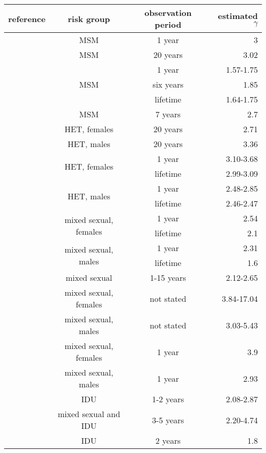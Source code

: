 \begin{tabular}{cccr}
  reference & risk group & observation period & estimated $\gamma$ \\
  \hline
  \textcite{colgate1989risk} & MSM & 1 year & 3 \\
  \textcite{clemenccon2015statistical} & MSM & 20 years & 3.02 \\
  \multirow{3}{*}{\textcite{schneeberger2004scale}} & 
    \multirow{3}{*}{MSM} & 1 year & 1.57-1.75 \\
  & & six years & 1.85 \\
  & & lifetime & 1.64-1.75 \\
  \textcite{brown2011transmission} & MSM & 7 years & 2.7 \\
  \hline
  \multirow{2}{*}{\textcite{clemenccon2015statistical}} & HET, females & 20 years & 2.71 \\
  & HET, males & 20 years & 3.36 \\
  \multirow{4}{*}{\textcite{schneeberger2004scale}} & 
    \multirow{2}{*}{HET, females} & 1 year & 3.10-3.68 \\
  & & lifetime & 2.99-3.09 \\
  & \multirow{2}{*}{HET, males} & 1 year & 2.48-2.85 \\
  & & lifetime & 2.46-2.47 \\
  \multirow{4}{*}{\textcite{liljeros2001web}} & 
    \multirow{2}{*}{mixed sexual, females} & 1 year & 2.54 \\
  & & lifetime & 2.1 \\
  & \multirow{2}{*}{mixed sexual, males} & 1 year & 2.31 \\
  & & lifetime & 1.6 \\
  \textcite{rothenberg2007large} & mixed sexual & 1-15 years & 2.12-2.65 \\
  \multirow{2}{*}{\textcite{jones2003assessment}} & mixed sexual, females 
    & not stated & 3.84-17.04 \\
  & mixed sexual, males & not stated & 3.03-5.43 \\
  \multirow{2}{*}{\textcite{latora2006network}} & mixed sexual, females & 1 year & 3.9 \\
  & mixed sexual, males & 1 year & 2.93 \\
  \hline
  \multirow{2}{*}{\textcite{rothenberg2007large}} & IDU & 1-2 years & 2.08-2.87 \\
  & mixed sexual and IDU & 3-5 years & 2.20-4.74 \\
  \textcite{dombrowski2013topological} & IDU & 2 years & 1.8 \\
  \hline
\end{tabular}
